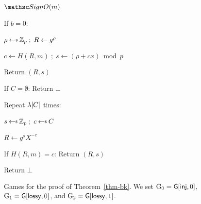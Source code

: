 \FloatBarrier
\begin{figure}[t]
{
\begin{oracle}{$\SignOracle(m)$}
\item If $b=0$:
\item \quad $\rho\getsr\Zp\;;\;R\gets g^{\rho}$
\item \quad $c\gets H(R,m)\;;\;s\gets(\rho+cx)\bmod p$
\item \quad Return $(R,s)$
\item If $C=\emptyset$: Return $\bot$
\item Repeat $\lambda|C|$ times:
\item \quad $s\getsr\Zp\;;\;c\getsr C$
\item \quad $R\gets g^sX^{-c}$
\item \quad If $H(R,m)=c$: Return $(R,s)$
\item Return $\bot$
\end{oracle}
}
\vspace{-12pt}
\caption{Games for the proof of Theorem~\ref{thm-bk}. We set
$\textnormal{G}_0=\mathsf{G}[\mathsf{inj},0]$,
$\textnormal{G}_1=\mathsf{G}[\mathsf{lossy},0]$, and
$\textnormal{G}_2=\mathsf{G}[\mathsf{lossy},1]$.}\label{fig-bk-games}
\vspace{-3pt}\hrulefill
\vspace{-1ex}
\end{figure}
\FloatBarrier


